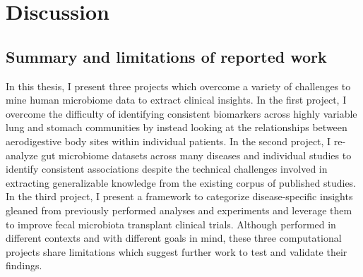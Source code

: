 \chapter{Discussion}

\section{Summary and limitations of reported work}

In this thesis, I present three projects which overcome a variety of challenges to mine human microbiome data to extract clinical insights.
In the first project, I overcome the difficulty of identifying consistent biomarkers across highly variable lung and stomach communities by instead looking at the relationships between aerodigestive body sites within individual patients.
In the second project, I re-analyze gut microbiome datasets across many diseases and individual studies to identify consistent associations despite the technical challenges involved in extracting generalizable knowledge from the existing corpus of published studies.
In the third project, I present a framework to categorize disease-specific insights gleaned from previously performed analyses and experiments and leverage them to improve fecal microbiota transplant clinical trials.
Although performed in different contexts and with different goals in mind, these three computational projects share limitations which suggest further work to test and validate their findings.

